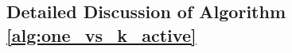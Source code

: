 

\vspace{-0.1in}
\noindent
\subsection{Detailed Discussion of Algorithm \ref{alg:one_vs_k_active}}

